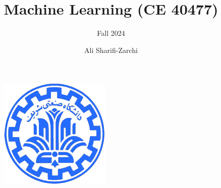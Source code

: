 \documentclass[serif, aspectratio=169]{beamer}
\author{Ali Sharifi-Zarchi}
\title{Machine Learning (CE 40477)}
\subtitle{Fall 2024}
\institute{
    CE Department \\
    Sharif University of Technology
}
\begin{document}
\begin{frame}
    \titlepage
    \vspace*{-0.6cm}
    \begin{figure}[htpb]
        \begin{center}
            \includegraphics[keepaspectratio, scale=0.25]{pic/sharif-main-logo}
        \end{center}
    \end{figure}
\end{frame}

\begin{frame}    
\tableofcontents[sectionstyle=show,
subsectionstyle=show/shaded/hide,
subsubsectionstyle=show/shaded/hide]
\end{frame}
\end{document}
